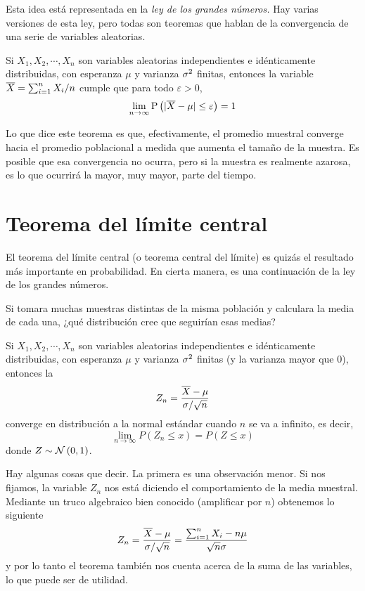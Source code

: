 Esta idea está representada en la \emph{ley de los grandes números.} Hay varias versiones de esta ley, pero todas son teoremas que hablan de la convergencia de una serie de variables aleatorias.

\formal
Si \(X_1, X_2, \cdots, X_n\) son variables aleatorias independientes e idénticamente distribuidas, con esperanza \(\mu\) y varianza \(\sigma^2\) finitas, entonces la variable \(\overline{X} = \sum_{i=1}^{n} X_i/n\) cumple que para todo \(\varepsilon >0\), \[\lim_{n\to\infty} \operatorname{P}\left(|\overline{X} - \mu| \leq \varepsilon\right) = 1\]

\informal
Lo que dice este teorema es que, efectivamente, el promedio muestral converge hacia el promedio poblacional a medida que aumenta el tamaño de la muestra. Es posible que esa convergencia no ocurra, pero si la muestra es realmente azarosa, es lo que ocurrirá la mayor, muy mayor, parte del tiempo.

\section{Teorema del límite central}

El teorema del límite central (o teorema central del límite) es quizás el resultado más importante en probabilidad. En cierta manera, es una continuación de la ley de los grandes números.

\begin{pausa}
Si tomara muchas muestras distintas de la misma población y calculara la media de cada una, ¿qué distribución cree que seguirían esas medias?
\end{pausa}

\formal
Si \(X_1, X_2, \cdots, X_n\) son variables aleatorias independientes e idénticamente distribuidas, con esperanza \(\mu\) y varianza \(\sigma^2\) finitas (y la varianza mayor que \(0\)), entonces la \va \[Z_n = \frac{\overline{X} - \mu}{\sigma/\sqrt{n}}\] converge en distribución a la normal estándar cuando \(n\) se va a infinito, es decir, \[\lim_{n\to\infty} P (Z_n \leq x) = P(Z \leq x)\] donde \(Z \sim \operatorname{\mathcal{N}}\left( 0, 1 \right)\).

\informal
Hay algunas cosas que decir. La primera es una observación menor. Si nos fijamos, la variable \(Z_n\) nos está diciendo el comportamiento de la media muestral. Mediante un truco algebraico bien conocido (amplificar por \(n\)) obtenemos lo siguiente \[Z_n = \frac{\overline{X} - \mu}{\sigma/\sqrt{n}} = \frac{\sum_{i=1}^{n}X_i - n\mu}{\sqrt{n}\sigma}\] y por lo tanto el teorema también nos cuenta acerca de la suma de las variables, lo que puede ser de utilidad.


